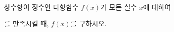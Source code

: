 상수항이 정수인 다항함수 $f(x)$가 모든 실수 $x$에 대하여 \par\smallskip{}\par\smallskip\noindent 를 만족시킬 때, $f(x)$를 구하시오.

